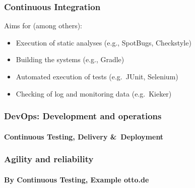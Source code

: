 
\begin{frame}
\frametitle{Continuous Integration}
Aims for (among others):
\begin{itemize}
	\item Execution of static analyses (e.g., SpotBugs, Checkstyle)
	\item Building the systems (e.g., Gradle)
	\item Automated execution of tests (e.g.\ JUnit, Selenium) \citep{TestAutomation2013}
	\item Checking of log and monitoring data (e.g.\ Kieker) \citep{SEN2015}
\end{itemize}
\end{frame}


\begin{frame}
\frametitle{DevOps: Development and operations}
\framesubtitle{Continuous Testing, Delivery \&\ Deployment}
\begin{center}
\end{center}
\end{frame}


\begin{frame}
\frametitle{Agility and reliability}
\framesubtitle{By Continuous Testing, Example otto.de \citep{ICSA2017}}
\begin{center}
\end{center}
\end{frame}
